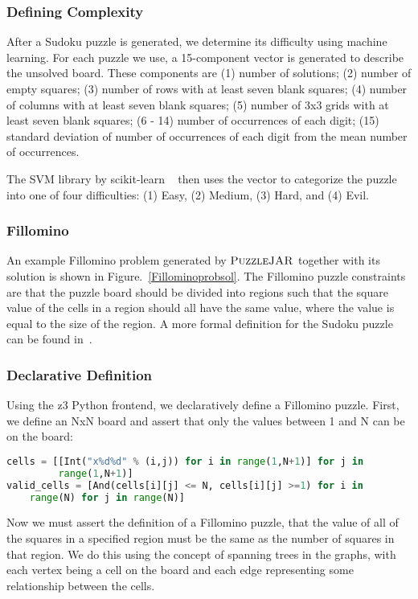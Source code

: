 \subsubsection*{Defining Complexity}
After a Sudoku puzzle is generated, we determine its difficulty using
machine learning. For each puzzle we use, a 15-component vector is generated to describe the unsolved board. These components are (1) number of solutions; (2) number of empty squares; (3) number of rows with at least seven blank squares; (4) number of columns with at least seven blank squares; (5) number of 3x3 grids with at least seven blank squares; (6 - 14) number of occurrences of each digit; (15) standard deviation of number of occurrences of each digit from the mean number of occurrences.

The SVM library by scikit-learn ~\cite{scikitlearn} then uses the vector to categorize the
puzzle into one of four difficulties: (1) Easy, (2) Medium, (3) Hard,
and (4) Evil.

\subsubsection{Fillomino}

An example Fillomino problem generated by $\textsc{PuzzleJAR}$ together with its
solution is shown in Figure.~\ref{Fillominoprobsol}. The Fillomino puzzle constraints are that the puzzle board should be divided into regions such that the square value of the cells in a region should all have the same value, where the value is equal to the size of the region. A more formal definition for the Sudoku puzzle can be found in~\cite{fillominodef}.

\subsubsection*{Declarative Definition}
Using the z3 Python frontend, we declaratively define a Fillomino puzzle.
First, we define an NxN board and assert that only the values between
1 and N can be on the board: 

\singlespace
\begin{lstlisting}[language=python, frame=single]
cells = [[Int("x%d%d" % (i,j)) for i in range(1,N+1)] for j in
         range(1,N+1)]
valid_cells = [And(cells[i][j] <= N, cells[i][j] >=1) for i in
	range(N) for j in range(N)]
\end{lstlisting}
\doublespace

Now we must assert the definition of a Fillomino puzzle, that the
value of all of the squares in a specified region must be the same as
the number of squares in that region. We do this using the concept of
spanning trees in the graphs, with each vertex being a cell on the board
and each edge representing some relationship between the cells.

